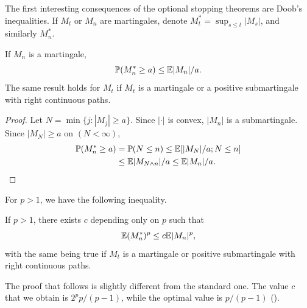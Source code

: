 
The first interesting consequences of the optional stopping theorems are Doob's inequalities. If $M_t$ or $M_n$ are martingales, denote $M_t^* = \sup_{s\leq t} |M_s|$, and similarly $M_n^*$.

\begin{theorem}\label{thm:ch1_4.6}
If $M_n$ is a martingale,
\[
    \mathbb{P}(M_n^* \geq a) \leq \mathbb{E}|M_n|/a.
\]
The same result holds for $M_t$ if $M_t$ is a martingale or a positive submartingale with right continuous paths.
\end{theorem}

\begin{proof}
Let $N = \min\{j : |M_j| \geq a\}$. Since $|\cdot|$ is convex, $|M_n|$ is a submartingale. Since $|M_N| \geq a$ on $(N < \infty)$,
\begin{align*}
    \mathbb{P}(M_n^* \geq a) &= \mathbb{P}(N \leq n) \leq \mathbb{E}[|M_N|/a;N \leq n] \\
    &\leq \mathbb{E}|M_{N\wedge n}|/a \leq \mathbb{E}|M_n|/a.
\end{align*}
\end{proof}

For $p > 1$, we have the following inequality.

\begin{theorem}\label{thm:ch1_4.7}
If $p > 1$, there exists $c$ depending only on $p$ such that
\[
    \mathbb{E}(M_n^*)^p \leq c\mathbb{E}|M_n|^p,
\]
with the same being true if $M_t$ is a martingale or positive submartingale with right continuous paths.
\end{theorem}

The proof that follows is slightly different from the standard one. The value $c$ that we obtain is $2^pp/(p-1)$, while the optimal value is $p/(p-1)$ (\cite[see][pp.~216-217]{Durrett1991}).


